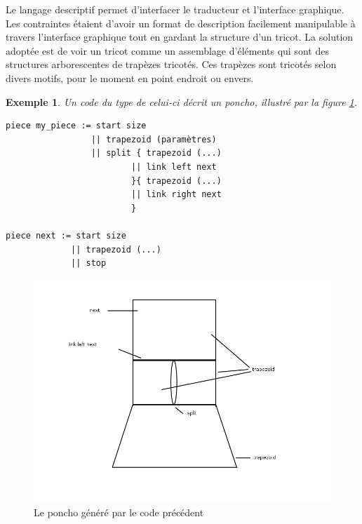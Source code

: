 \documentclass{article}
\newtheorem{ex}{Exemple}
\begin{document}
Le langage descriptif permet d'interfacer le traducteur et l'interface graphique. Les contraintes étaient d'avoir un format de description facilement manipulable à travers l'interface graphique tout en gardant la structure d'un tricot. La solution adoptée est de voir un tricot comme un assemblage d'éléments qui sont des structures arborescentes de trapèzes tricotés. Ces trapèzes sont tricotés selon divers motifs, pour le moment en point endroit ou envers.


\begin{ex}
  Un code du type de celui-ci décrit un poncho, illustré par la figure \ref{poncho}.
\end{ex}

\begin{lstlisting}
piece my_piece := start size
                 || trapezoid (paramètres) 
                 || split { trapezoid (...)
                         || link left next
                         }{ trapezoid (...)
                         || link right next
                         }

piece next := start size
             || trapezoid (...)
             || stop
\end{lstlisting}

\begin{figure}[!h]
  \centering
  \includegraphics[scale=0.4]{../img/poncho.png}
  \caption{Le poncho généré par le code précédent}
  \label{poncho}
\end{figure}
\end{document}
